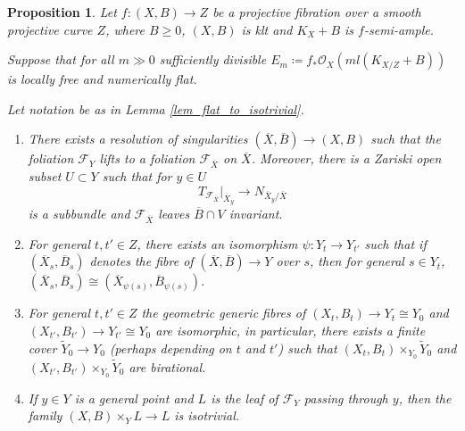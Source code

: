 \documentclass[12pt]{amsart}
\theoremstyle{plain}
\newtheorem{proposition}[theorem]{Proposition}
\theoremstyle{definition}
\begin{document}
\begin{proposition}
\label{prop_lift}
Let $f\colon (X, B) \rightarrow Z$ be a projective fibration over a 
smooth projective curve $Z$, where $B \geq 0$,  $(X, B)$
is klt and $K_X+B$ is $f$-semi-ample.

Suppose that for all $m \gg 0$ sufficiently divisible 
$E_m \coloneqq f_*\mathcal O_X(ml(K_{X/Z}+B))$ is locally free
and numerically flat.

Let notation be as in Lemma \ref{lem_flat_to_isotrivial}.
\begin{enumerate}
\item There exists a resolution of singularities $(\overline{X}, \overline{B}) \rightarrow (X, B)$ such that 
the foliation $\mathcal F_Y$ lifts to a foliation $\mathcal F_{\overline{X}}$ on $\overline{X}$.
Moreover, there is a Zariski open subset $U \subset Y$ such that for $y \in U$ 
\[T_{\mathcal F_{\overline{X}}}\vert_{\overline{X}_y} \to N_{\overline{X}_y/\overline{X}}\] is a subbundle
and $\mathcal F_{\overline{X}}$ 
leaves $\overline{B} \cap V$ 
invariant.  

\item For general $t, t' \in Z$, 
there exists an isomorphism $\psi\colon Y_t \rightarrow Y_{t'}$ 
such that if $(\overline{X}_s, \overline{B}_s)$ denotes
the fibre of $(\overline{X}, \overline{B}) \rightarrow Y$ over $s$, then for general $s \in Y_t$, 
$(\overline{X}_s, \overline{B}_s)
\cong (\overline{X}_{\psi(s)}, \overline{B}_{\psi(s)})$.

\item For general $t, t' \in Z$ the geometric generic fibres of $(X_t, B_t) \rightarrow Y_t \cong Y_0$ and  
$(X_{t'}, B_{t'}) \rightarrow Y_{t'} \cong Y_0$  are isomorphic, in particular, 
there exists a finite cover $\tilde{Y}_0 \rightarrow Y_0$ 
(perhaps depending on $t$ and $t'$) such that  
$(X_t, B_t)\times_{Y_0}\tilde{Y}_0$ and $(X_{t'}, B_{t'})\times_{Y_0}\tilde{Y}_0$ are birational.

\item If $y \in Y$ is a general point and $L$ is the leaf of $\mathcal F_Y$ passing through $y$, 
then the family $(X, B) \times_Y L \rightarrow L$ is isotrivial.

\end{enumerate}
\end{proposition}
\end{document}
